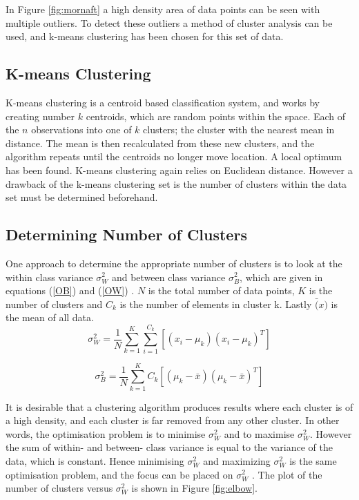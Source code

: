 \noindent In Figure \ref{fig:mornaft} a high density area of data points can be seen with multiple outliers. To detect these outliers a method of cluster analysis can be used, and k-means clustering has been chosen for this set of data.



\subsection{K-means Clustering}
\label{sec:kmeans}

\noindent  K-means clustering is a centroid based classification system, and works by  creating number $k$ centroids, which are random points within the space.   Each of the $n$ observations into one of $k$ clusters; the cluster with the nearest mean in distance. The mean is then recalculated from these new clusters, and the algorithm repeats until the centroids no longer move location. A local optimum has been found. K-means clustering again relies on Euclidean distance. However a drawback of the k-means clustering set is the number of clusters within the data set must be determined beforehand. 



\subsection{Determining Number of Clusters}
\label{determinenocluster}


One approach to determine the appropriate number of clusters is to look at the within class variance $\sigma^2_{W}$ and between class variance $\sigma^2_{B}$, which are given in equations (\ref{OB}) and (\ref{OW}) . $N$ is the total number of data points, $K$ is the number of clusters and $C_{k}$  is the number of elements in cluster k. Lastly $\bar(x)$ is the mean of all data.
\begin{equation}
\label{OW}
\sigma^2_{W} = \frac{1}{N}\sum_{k = 1}^{K}\sum_{i = 1}^{C_{k}}[(x_{i} - \mu_{k})(x_{i} - \mu_{k})^T]
\end{equation}

\begin{equation}
\label{OB}
\sigma^2_{B} = \frac{1}{N}\sum_{k = 1}^{K} C_{k}[(\mu_{k}-\bar{x})(\mu_{k}-\bar{x})^T]
\end{equation}


\noindent It is desirable that a clustering algorithm produces results where each cluster is of a high density, and each cluster is far removed from any other cluster. In other words, the optimisation problem is to minimise $\sigma^2_{W}$ and to maximise $\sigma^2_W$. However the sum of within- and between- class variance is equal to the variance of the data, which is constant. Hence minimising $\sigma^2_{W}$ and maximizing $\sigma^2_W$ is the same optimisation problem, and the focus can be placed on $\sigma^2_{W}$ . The plot of the number of clusters versus $\sigma^2_{W}$ is shown in Figure \ref{fig:elbow}.\cite{cluster}



